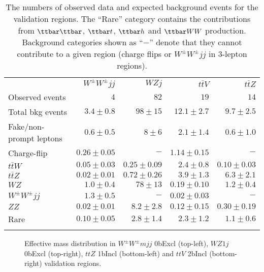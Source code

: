 \begin{table}[htb!]
\caption{The numbers of observed data and expected background events for the validation regions. 
The ``Rare'' category contains the contributions from $\ttbar \ttbar$, $\ttbar t$, $\ttbar h$ and $\ttbar WW$ production. Background categories shown as ``$-$'' denote that they cannot contribute to a given region (charge flips or $W^\pm W^\pm jj$ in 3-lepton regions).}
\label{tab:Results_VR_allCh}
\begin{center}
\setlength{\tabcolsep}{0.0pc}
{\small
\begin{tabular*}{\textwidth}{@{\extracolsep{\fill}}lrrrr}
\noalign{\smallskip}\hline\noalign{\smallskip}
			& $W^\pm W^\pm jj$        & $WZj$     & $t\bar t V$ & $t\bar tZ$     \\[-0.05cm]
\noalign{\smallskip}\hline\noalign{\smallskip}
Observed events          & $4$       &  $82$   & $19$  & $14$             \\
\noalign{\smallskip}\hline\noalign{\smallskip}
Total bkg events & $3.4 \pm 0.8$ & $98 \pm 15$ & $12.1 \pm 2.7$ & $9.7 \pm 2.5$\\
\noalign{\smallskip}\hline\noalign{\smallskip}
Fake/non-prompt leptons & $0.6 \pm 0.5$ & $8 \pm 6$ & $2.1 \pm 1.4$ & $0.6\pm 1.0$\\ %
Charge-flip & $0.26 \pm 0.05$ & $-$ & $1.14 \pm 0.15$ & $-$\\ %
$t\bar{t}W$ & $0.05 \pm 0.03$ & $0.25 \pm 0.09$ & $2.4 \pm 0.8$ & $0.10 \pm 0.03$\\
$t\bar{t}Z$ & $0.02 \pm 0.01$ & $0.72 \pm 0.26$ & $3.9 \pm 1.3$ & $6.3 \pm 2.1$\\
$WZ$ & $1.0 \pm 0.4$ & $78 \pm 13$ & $0.19 \pm 0.10$ & $1.2 \pm 0.4$\\ %
$W^\pm W^\pm jj$ & $1.3 \pm 0.5$ & $-$ & $0.02 \pm 0.03$ & $-$\\
$ZZ$ & $0.02 \pm 0.01$ & $8.2 \pm 2.8$ & $0.12 \pm 0.15$ & $0.30 \pm 0.19$\\ %
Rare & $0.10 \pm 0.05$ & $2.8 \pm 1.4$ & $2.3 \pm 1.2$ & $1.1 \pm 0.6$\\
\noalign{\smallskip}\hline\hline\noalign{\smallskip}
\end{tabular*}
}
\end{center}
\end{table}

     
\begin{figure}[h!]
\centering
{}
\caption{Effective mass distribution in $W^\pm W^{\pm}mjj$ 0bExcl (top-left), $WZ1j$ 0bExcl (top-right), $ttZ$ 1bIncl (bottom-left) and $ttV$ 2bIncl (bottom-right) validation regions.}
\label{fig:Results_VR}
\end{figure} 

